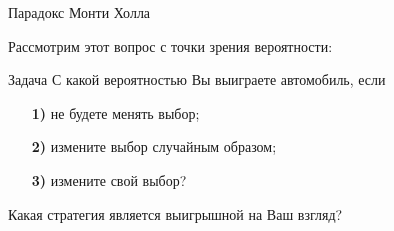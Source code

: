 \documentclass[14 pt,xcolor=dvipsnames]{beamer}
\begin{document}


\begin{frame} %




\end{frame}


\begin{frame} %




\end{frame}




\begin{frame}{Парадокс Монти Холла}


    Рассмотрим этот вопрос с точки зрения вероятности:
    
    
    \begin{block}{\task Задача}
    С какой вероятностью Вы выиграете автомобиль, если
    
    \begin{itemize}[<+->]
    \item[\bf 1)] не будете менять выбор;
    
    \item[\bf 2)] измените выбор случайным образом;
    
    \item[\bf 3)] измените свой выбор?
    \end{itemize}
    
    \end{block}
    
    \pause[\thebeamerpauses]
    \quest Какая стратегия является выигрышной на Ваш взгляд?
    
    \end{frame}
    
\end{document}

